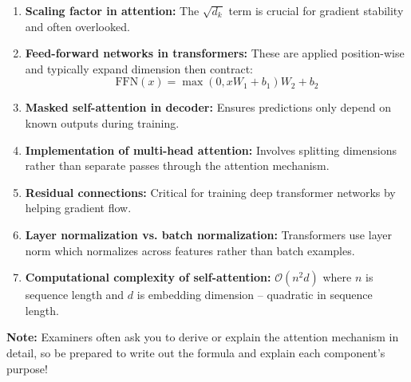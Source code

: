 \begin{enumerate}
    \item \textbf{Scaling factor in attention:} The $\sqrt{d_k}$ term is crucial for gradient stability and often overlooked.

    \item \textbf{Feed-forward networks in transformers:} These are applied position-wise and typically expand dimension then contract:
    \[
    \text{FFN}(x) = \max(0, xW_1 + b_1)W_2 + b_2
    \]

    \item \textbf{Masked self-attention in decoder:} Ensures predictions only depend on known outputs during training.

    \item \textbf{Implementation of multi-head attention:} Involves splitting dimensions rather than separate passes through the attention mechanism.

    \item \textbf{Residual connections:} Critical for training deep transformer networks by helping gradient flow.

    \item \textbf{Layer normalization vs. batch normalization:} Transformers use layer norm which normalizes across features rather than batch examples.

    \item \textbf{Computational complexity of self-attention:} $\mathcal{O}(n^2d)$ where $n$ is sequence length and $d$ is embedding dimension – quadratic in sequence length.
\end{enumerate}

\textbf{Note:} Examiners often ask you to derive or explain the attention mechanism in detail, so be prepared to write out the formula and explain each component's purpose!

